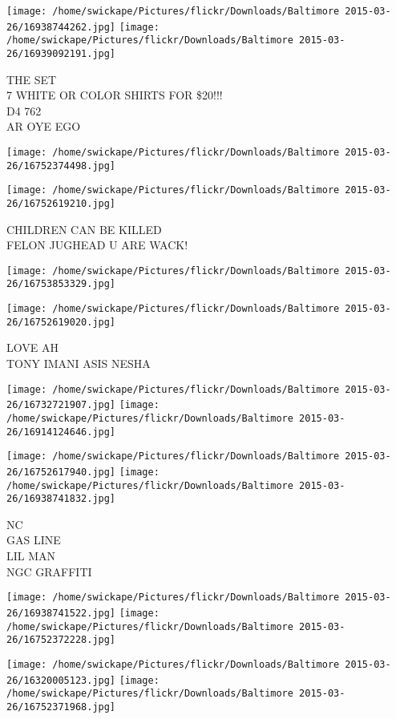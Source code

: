 \documentclass[10pt,letterpaper]{article}
\begin{document}
\texttt{[image: /home/swickape/Pictures/flickr/Downloads/Baltimore 2015-03-26/16938744262.jpg]}
\texttt{[image: /home/swickape/Pictures/flickr/Downloads/Baltimore 2015-03-26/16939092191.jpg]}

THE SET\\
7 WHITE OR COLOR SHIRTS FOR \$20!!!\\
D4 762\\
AR OYE EGO
\pagebreak

\texttt{[image: /home/swickape/Pictures/flickr/Downloads/Baltimore 2015-03-26/16752374498.jpg]}

\vspace{0.25in}
\texttt{[image: /home/swickape/Pictures/flickr/Downloads/Baltimore 2015-03-26/16752619210.jpg]}

CHILDREN CAN BE KILLED\\
FELON JUGHEAD U ARE WACK!
\pagebreak

\texttt{[image: /home/swickape/Pictures/flickr/Downloads/Baltimore 2015-03-26/16753853329.jpg]}

\vspace{0.25in}
\texttt{[image: /home/swickape/Pictures/flickr/Downloads/Baltimore 2015-03-26/16752619020.jpg]}

LOVE AH\\
TONY IMANI ASIS NESHA
\pagebreak

\texttt{[image: /home/swickape/Pictures/flickr/Downloads/Baltimore 2015-03-26/16732721907.jpg]}
\texttt{[image: /home/swickape/Pictures/flickr/Downloads/Baltimore 2015-03-26/16914124646.jpg]}

\texttt{[image: /home/swickape/Pictures/flickr/Downloads/Baltimore 2015-03-26/16752617940.jpg]}
\texttt{[image: /home/swickape/Pictures/flickr/Downloads/Baltimore 2015-03-26/16938741832.jpg]}

NC\\
GAS LINE\\
LIL MAN\\
NGC GRAFFITI
\pagebreak

\texttt{[image: /home/swickape/Pictures/flickr/Downloads/Baltimore 2015-03-26/16938741522.jpg]}
\texttt{[image: /home/swickape/Pictures/flickr/Downloads/Baltimore 2015-03-26/16752372228.jpg]}

\texttt{[image: /home/swickape/Pictures/flickr/Downloads/Baltimore 2015-03-26/16320005123.jpg]}
\texttt{[image: /home/swickape/Pictures/flickr/Downloads/Baltimore 2015-03-26/16752371968.jpg]}
\end{document}
